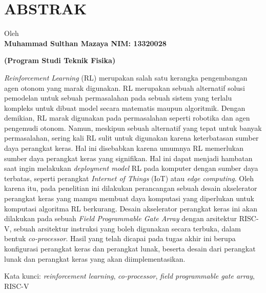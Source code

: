 \clearpage
\chapter*{ABSTRAK}
\vspace{5mm}
\begin{center}
      \large\bfseries\MakeUppercase{\thetitle}
  
      \normalfont\normalsize

      Oleh\\
      \bfseries{Muhammad Sulthan Mazaya \hspace{5mm} NIM: 13320028}

      \vspace{5mm}
      \large\bfseries{(Program Studi Teknik Fisika)}
      \vspace{5mm}

\end{center} 

\begin{singlespace}
    \small
    \textit{Reinforcement Learning} (RL) merupakan salah satu kerangka pengembangan agen
    otonom yang marak digunakan. RL merupakan sebuah alternatif solusi pemodelan
    untuk sebuah permasalahan pada sebuah sistem yang terlalu kompleks untuk dibuat
    model secara matematis maupun algoritmik. Dengan demikian, RL marak
    digunakan pada permasalahan seperti robotika dan agen pengemudi otonom.
    Namun, meskipun sebuah alternatif yang tepat untuk banyak permasalahan, sering
    kali RL sulit untuk digunakan karena keterbatasan sumber daya perangkat keras.
    Hal ini disebabkan karena umumnya RL memerlukan sumber daya perangkat keras
    yang signifikan. Hal ini dapat menjadi hambatan saat ingin melakukan \textit{deployment
    model} RL pada komputer dengan sumber daya terbatas, seperti perangkat \textit{Internet
    of Things} (IoT) atau \textit{edge computing}. Oleh karena itu, pada penelitian ini dilakukan
    perancangan sebuah desain akselerator perangkat keras yang mampu membuat
    daya komputasi yang diperlukan untuk komputasi algoritma RL berkurang. Desain
    akselerator perangkat keras ini akan dilakukan pada sebuah \textit{Field Programmable
    Gate Array} dengan arsitektur RISC-V, sebuah arsitektur instruksi yang boleh
    digunakan secara terbuka, dalam bentuk \textit{co-processor}. Hasil yang telah dicapai
    pada tugas akhir ini berupa konfigurasi perangkat keras dan perangkat lunak,
    beserta desain dari perangkat lunak dan perangkat keras yang akan
    diimplementasikan.

    Kata kunci: \textit{reinforcement learning}, \textit{co-processor}, \textit{field programmable gate array}, RISC-V
\end{singlespace}
\clearpage
